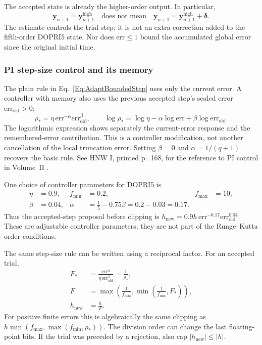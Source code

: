 The accepted state is already the higher-order output. In particular,
\[
 \mathbf y_{n+1}=\mathbf y_{n+1}^{\mathrm{high}}
 \quad\text{does not mean}\quad
 \mathbf y_{n+1}=\mathbf y_{n+1}^{\mathrm{high}}+\boldsymbol\delta.
\]
The estimate controls the trial step; it is not an extra correction added to
the fifth-order DOPRI5 state. Nor does $\mathrm{err}\leq1$ bound the accumulated
global error since the original initial time.

\subsubsection{PI step-size control and its memory}
The plain rule in Eq.~\ref{Eq:AdaptBoundedStep} uses only the current error.
A controller with memory also uses the previous accepted step's scaled error
$\mathrm{err}_{\mathrm{old}}>0$:
\begin{equation}\label{Eq:AdaptPIProposal}
 \rho_* =\eta\,\mathrm{err}^{-\alpha}
                   \mathrm{err}_{\mathrm{old}}^{\beta},
 \qquad
 \log\rho_* =\log\eta-\alpha\log\mathrm{err}
                         +\beta\log\mathrm{err}_{\mathrm{old}}.
\end{equation}
The logarithmic expression shows separately the current-error response and
the remembered-error contribution. This is a controller modification, not
another cancellation of the local truncation error. Setting $\beta=0$ and
$\alpha=1/(q+1)$ recovers the basic rule. See HNW I, printed p.~168, for the
reference to PI control in Volume~II \cite{HNW1993}.

One choice of controller parameters for DOPRI5 is
\begin{equation}\label{Eq:AdaptDopriPIConstants}
\begin{aligned}
 \eta&=0.9,& f_{\min}&=0.2,& f_{\max}&=10,\\
 \beta&=0.04,&
 \alpha&=\frac15-0.75\beta
        =0.2-0.03=0.17.
\end{aligned}
\end{equation}
Thus the accepted-step proposal before clipping is
$h_{\mathrm{new}}=0.9h\,\mathrm{err}^{-0.17}
\mathrm{err}_{\mathrm{old}}^{0.04}$.
These are adjustable controller parameters; they are not part of the
Runge--Kutta order conditions.

The same step-size rule can be written using a reciprocal factor. For an
accepted trial,
\begin{equation}\label{Eq:AdaptPIReciprocal}
\begin{aligned}
 F_*&=\frac{\mathrm{err}^{\alpha}}
           {\eta\,\mathrm{err}_{\mathrm{old}}^{\beta}}
       =\frac1{\rho_*},\\
 F&=\max\!\left(\frac1{f_{\max}},
           \min\!\left(\frac1{f_{\min}},F_*\right)\right),\\
 h_{\mathrm{new}}&=\frac hF.
\end{aligned}
\end{equation}
For positive finite errors this is algebraically the same clipping as
$h\min(f_{\max},\max(f_{\min},\rho_*))$. The division order can change the
last floating-point bits. If the trial was preceded by a rejection, also
cap $|h_{\mathrm{new}}|\leq|h|$.

